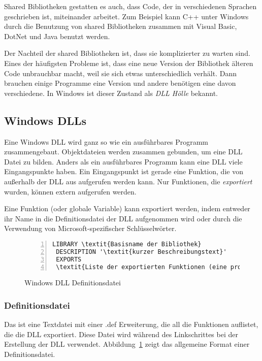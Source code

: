 Shared Bibliotheken gestatten es auch, dass Code, der in
verschiedenen Sprachen geschrieben ist, miteinander arbeitet. Zum
Beispiel kann C++ unter Windows durch die Benutzung von shared
Bibliotheken zusammen mit Visual Basic,  DotNet
 und Java  benutzt werden.

Der Nachteil der shared Bibliotheken ist, dass sie komplizierter zu
warten sind. Eines der h\"{a}ufigsten Probleme ist, dass eine neue
Version der Bibliothek \"{a}lteren Code unbrauchbar macht, weil sie sich
etwas unterschiedlich verh\"{a}lt. Dann brauchen einige Programme eine
Version und andere ben\"{o}tigen eine davon verschiedene. In Windows ist
dieser Zustand als \emph{DLL H\"{o}lle} bekannt. 

\subsection{Windows DLLs}

Eine Windows DLL wird ganz so wie ein ausf\"{u}hrbares Programm
zusammengebaut. Objektdateien werden zusammen gebunden, um eine DLL
Datei zu bilden. Anders als ein ausf\"{u}hrbares Programm kann eine DLL
viele Eingangspunkte haben. Ein Eingangspunkt ist gerade eine
Funktion, die von au{\ss}erhalb der DLL aus aufgerufen werden kann. Nur
Funktionen, die \emph{exportiert}  wurden, k\"{o}nnen
extern aufgerufen werden.

Eine Funktion (oder globale Variable) kann exportiert werden, indem
entweder ihr Name in die Definitionsdatei
 der DLL aufgenommen wird oder durch die
Verwendung von Microsoft-spezifischer Schl\"{u}sselw\"{o}rter.

\begin{figure}[ht]
\begin{Verbatim}[frame=single, numbers=left, commandchars=\\\{\}]
 LIBRARY \textit{Basisname der Bibliothek}
 DESCRIPTION '\textit{kurzer Beschreibungstext}'
 EXPORTS
 \textit{Liste der exportierten Funktionen (eine pro Zeile)}
\end{Verbatim}
\caption{Windows DLL Definitionsdatei\label{fig:DefFile}}
\end{figure}

\subsubsection{Definitionsdatei}
Das ist eine Textdatei mit einer {\code .def} Erweiterung, die all
die Funktionen auf\/listet, die die DLL exportiert. Diese Datei wird
w\"{a}hrend des Linkschrittes bei der Erstellung der DLL verwendet.
Abbildung~\ref{fig:DefFile} zeigt das allgemeine Format einer
Definitionsdatei.

